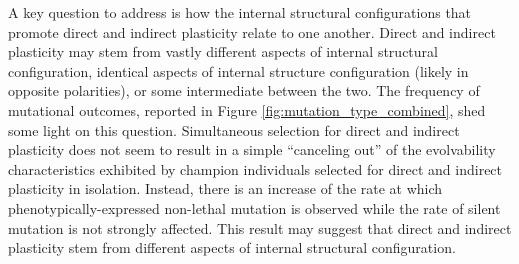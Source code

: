 A key question to address is how the internal structural configurations that promote direct and indirect plasticity relate to one another.
Direct and indirect plasticity may stem from vastly different aspects of internal structural configuration, identical aspects of internal structure configuration (likely in opposite polarities), or some intermediate between the two.
The frequency of mutational outcomes, reported in Figure \ref{fig:mutation_type_combined}, shed some light on this question.
Simultaneous selection for direct and indirect plasticity does not seem to result in a simple ``canceling out'' of the evolvability characteristics exhibited by champion individuals selected for direct and indirect plasticity in isolation.
Instead, there is an increase of the rate at which phenotypically-expressed non-lethal mutation is observed while the rate of silent mutation is not strongly affected.
This result may suggest that direct and indirect plasticity stem from different aspects of internal structural configuration. 